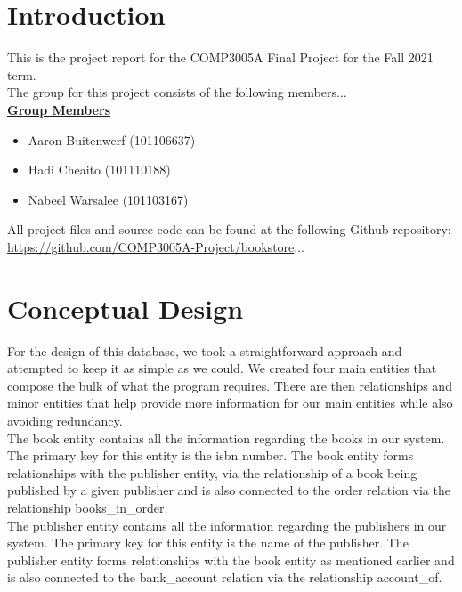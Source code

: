 \documentclass[a4 paper]{article}
\begin{document}

\section*{Introduction}
This is the project report for the COMP3005A Final Project for the Fall 2021 term.\\
The group for this project consists of the following members...\\

\noindent\underline{\textbf{Group Members}}
\begin{itemize}
	\item Aaron Buitenwerf (101106637)
	\item Hadi Cheaito (101110188)
	\item Nabeel Warsalee (101103167)
\end{itemize}

\noindent All project files and source code can be found at the following Github repository:\\ \href{https://github.com/COMP3005A-Project/bookstore}{https://github.com/COMP3005A-Project/bookstore}...

\section{Conceptual Design}
For the design of this database, we took a straightforward approach and attempted to keep it as simple as we could. We created four main entities that compose the bulk of what the program requires. There are then relationships and minor entities that help provide more information for our main entities while also avoiding redundancy.\\

\noindent The book entity contains all the information regarding the books in our system. The primary key for this entity is the isbn number. The book entity forms relationships with the publisher entity, via the relationship of a book being published by a given publisher and is also connected to the order relation via the relationship books\_in\_order.\\

\noindent The publisher entity contains all the information regarding the publishers in our system. The primary key for this entity is the name of the publisher. The publisher entity forms relationships with the book entity as mentioned earlier and is also connected to the bank\_account relation via the relationship account\_of.\\
\end{document}
